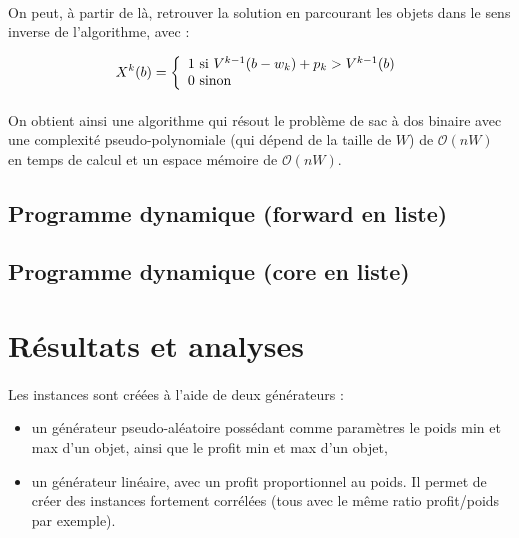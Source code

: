 \documentclass[12pt]{article}
\begin{document}
\paragraph{}On peut, à partir de là, retrouver la solution en parcourant les objets dans le sens inverse de l'algorithme, avec :

\[
X^k(b) = \left\{
	\begin{array}{ll}
		1 \textnormal{ si } V^{k-1}(b-w_k)+p_k > V^{k-1}(b) \\
		0 \textnormal{ sinon} 
	\end{array}
	\right.
\]

\paragraph{}On obtient ainsi une algorithme qui résout le problème de sac à dos binaire avec une complexité pseudo-polynomiale (qui dépend de la taille de $W$) de $\mathcal{O}(nW)$ en temps de calcul et un espace mémoire de $\mathcal{O}(nW)$.

\subsection{Programme dynamique (forward en liste)}

\paragraph{}

\subsection{Programme dynamique (core en liste)}

\paragraph{}

\section{Résultats et analyses}

\paragraph{}Les instances sont créées à l'aide de deux générateurs :
\begin{itemize}
\item un générateur pseudo-aléatoire possédant comme paramètres le poids min et max d'un objet, ainsi que le profit min et max d'un objet,
\item un générateur linéaire, avec un profit proportionnel au poids. Il permet de créer des instances fortement corrélées (tous avec le même ratio profit/poids par exemple).
\end{itemize}
\end{document}
